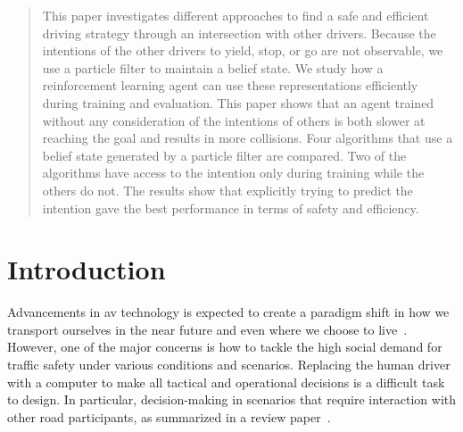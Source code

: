 
\glsresetall



\begin{abstract}
This paper investigates different approaches to find a safe and efficient driving strategy through an intersection with other drivers.
Because the intentions of the other drivers to yield, stop, or go are not observable, we use a particle filter to maintain a belief state. 
We study how a reinforcement learning agent can use these representations efficiently during training and evaluation.
This paper shows that an agent trained without any consideration of the intentions of others is both slower at reaching the goal and results in more collisions.
Four algorithms that use a belief state generated by a particle filter are compared. Two of the algorithms have access to the intention only during training while the others do not. The results show that explicitly trying to predict the intention gave the best performance in terms of safety and efficiency.

\end{abstract}

\section{Introduction}
Advancements in \gls{av} technology is expected to create a paradigm shift in how we transport ourselves in the near future and even where we choose to live~\cite{McKinsey2023}. However, one of the major concerns is how to tackle the high social demand for traffic safety under various conditions and scenarios. 
Replacing the human driver with a computer to make all tactical and operational decisions is a difficult task to design. In particular, decision-making in scenarios that require interaction with other road participants, as summarized in a review paper~\cite{Schwarting2018}.

